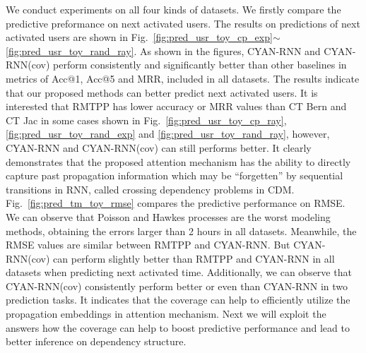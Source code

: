 We conduct experiments on all four
kinds of datasets. We firstly compare the predictive preformance on
next activated users. The results on predictions of next
activated users are shown in Fig.~\ref{fig:pred_usr_toy_cp_exp}$\sim$
\ref{fig:pred_usr_toy_rand_ray}. As shown in the figures, CYAN-RNN and CYAN-RNN(cov)
perform consistently and significantly better than other baselines in metrics of
Acc@1, Acc@5 and MRR, included in all datasets. 
The results indicate that our proposed methods can better predict next activated
users. It is interested that RMTPP has lower accuracy or MRR values than CT Bern
and CT Jac in some cases shown in
Fig.~\ref{fig:pred_usr_toy_cp_ray},
\ref{fig:pred_usr_toy_rand_exp} and \ref{fig:pred_usr_toy_rand_ray}, however,
CYAN-RNN and CYAN-RNN(cov) can still performs better. It clearly demonstrates
that the proposed attention mechanism has the ability to directly capture past
propagation information which may be ``forgetten'' by sequential transitions in
RNN, called crossing dependency problems in CDM.
Fig.~\ref{fig:pred_tm_toy_rmse} compares the predictive performance on RMSE.
We can observe that Poisson and Hawkes processes are the worst modeling methods,
obtaining the errors larger than 2 hours in all datasets. Meanwhile, the
RMSE values are similar between RMTPP and CYAN-RNN. But 
CYAN-RNN(cov) can perform slightly better than RMTPP and CYAN-RNN in all
datasets when predicting next activated time. 
Additionally, we can observe that CYAN-RNN(cov) consistently perform better or
even than CYAN-RNN in two prediction tasks. It indicates that the coverage can
help to efficiently utilize the propagation embeddings in attention mechanism.
Next we will exploit the answers how the coverage can help to boost predictive
performance and lead to better inference on dependency structure.

